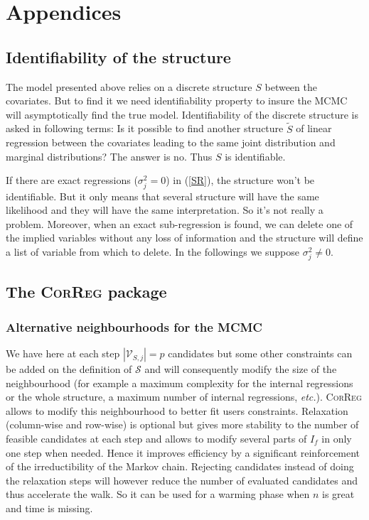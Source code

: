 \documentclass[11pt,a4paper]{article}
\begin{document}
\section{Appendices}
	\subsection{Identifiability of the structure}
	The model presented above relies on a discrete structure $S$ between the covariates. But to find it we need identifiability property to insure the MCMC will asymptotically find the true model. Identifiability of the discrete structure is asked in following terms: Is it possible to find another structure $\tilde{S}$ of linear regression between the covariates leading to the same joint distribution and marginal distributions? The answer is no. Thus $S$ is identifiable.
	
	
	If there are exact regressions ($\sigma^2_j=0$) in (\ref{SR}), the structure won't be identifiable. But it only means that several structure will have the same likelihood and they will have the same interpretation. So it's not really a problem. Moreover, when an exact sub-regression is found, we can delete one of the implied variables without any loss of information and the structure will define a list of variable from which to delete. %
	In the followings we suppose $\sigma^2_j\neq 0$.
	
	\subsection{The \textsc{CorReg} package}
\subsubsection{Alternative neighbourhoods for the MCMC}
	We have here at each step $|\mathcal{V}_{S,j}|=p$ candidates but some other constraints can be added on the definition of $\mathcal{S}$ and will consequently modify the size of the neighbourhood (for example a maximum complexity for the internal regressions or the whole structure, a maximum number of internal regressions, {\it etc.}). \textsc{CorReg} allows to modify this neighbourhood to better fit users constraints. Relaxation (column-wise and row-wise) is optional but gives more stability to the number of feasible candidates at each step and allows to modify several parts of $I_f$ in only one step when needed. Hence it improves efficiency by a significant reinforcement of the irreductibility of the Markov chain. Rejecting candidates instead of doing the relaxation steps will  however reduce the number of evaluated candidates and thus accelerate the walk. So it can be used for a warming phase when $n$ is great and time is missing.
	
\end{document}
